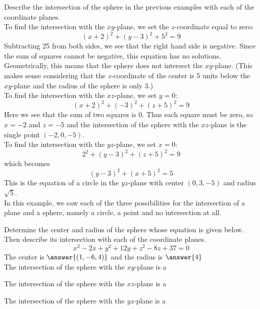 \documentclass[handout]{ximera}
\begin{document}
\begin{example}
Describe the intersection of the sphere in the previous examples with each of the coordinate planes.\\
To find the intersection with the $xy$-plane, we set the $z$-coordinate equal to zero:
\[
(x+2)^2 +(y-3)^2 + 5^2 = 9
\]
Subtracting 25 from both sides, we see that the right hand side is negative.  Since the sum of squares cannot be negative, this equation has no solutions.
Geometrically, this means that the sphere does not intersect the $xy$-plane. 
(This makes sense considering that the $z$-coordinate of the center is 5 units below the $xy$-plane and the radius of the sphere is only 3.)\\
To find the intersection with the $xz$-plane, we set $y = 0$:
\[
(x+2)^2 + (-3)^2 + (z+5)^2 = 9
\]
Here we see that the sum of two squares is 0.  Thus each square must be zero, so $x = -2$ and $z = -5$ and 
the intersection of the sphere with the $xz$-plane is the single point $(-2, 0, -5)$.\\
To find the intersection with the $yz$-plane, we set $x = 0$:
\[
2^2 + (y-3)^2 + (z+5)^2 = 9
\]
which becomes
\[
(y-3)^2 + (x+5)^2 = 5
\]
This is the equation of a circle in the $yz$-plane with center $(0, 3, -5)$ and radius $\sqrt 5$.\\
In this example, we saw each of the three possibilities for the intersection of a plane and a sphere, namely a circle, a point and no intersection at all.
\end{example}


\begin{problem}
Determine the center and radius of the sphere whose equation is given below.  Then describe its intersection with each of the coordinate planes.
\[
x^2 - 2x + y^2 + 12y + z^2 - 8z +37 = 0
\]
The center is $\answer{(1, -6, 4)}$ and the radius is $\answer{4}$\\
The intersection of the sphere with the $xy$-plane is a 
\begin{multipleChoice}
\end{multipleChoice}

The intersection of the sphere with the $xz$-plane is a 
\begin{multipleChoice}
\end{multipleChoice}

The intersection of the sphere with the $yz$-plane is a 
\begin{multipleChoice}
\end{multipleChoice}

\end{problem}
\end{document}
